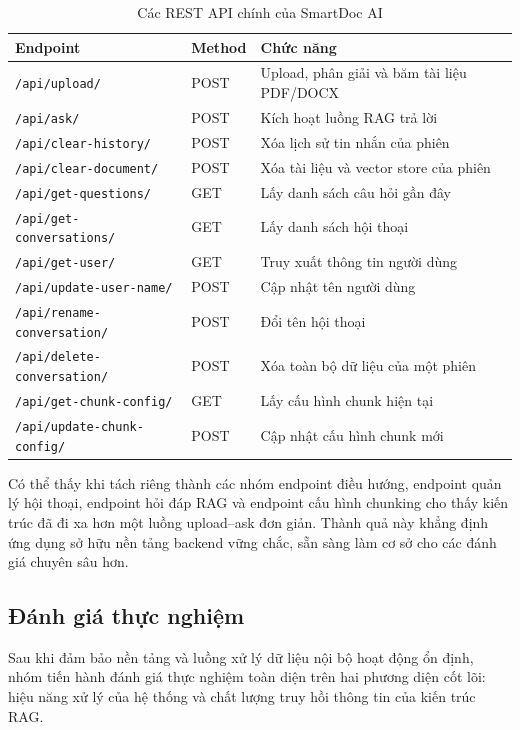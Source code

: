 \documentclass[10pt, conference, a4paper, compsocconf]{IEEEtran}
\newcommand{\smartdoc}{SmartDoc AI}
\begin{document}
\begin{table}[H]
  \renewcommand{\arraystretch}{1.1}
  \caption{Các REST API chính của \smartdoc{}}
  \label{tab:rest-api}
  \centering
  \scriptsize
  \begin{tabular}{|p{}|p{}|p{}|}
    \hline
    Endpoint & Method & Chức năng \\
    \hline
    \texttt{/api/upload/} & POST & Upload, phân giải và băm tài liệu PDF/DOCX \\
    \hline
    \texttt{/api/ask/} & POST & Kích hoạt luồng RAG trả lời \\
    \hline
    \texttt{/api/clear-history/} & POST & Xóa lịch sử tin nhắn của phiên \\
    \hline
    \texttt{/api/clear-document/} & POST & Xóa tài liệu và vector store của phiên \\
    \hline
    \texttt{/api/get-questions/} & GET & Lấy danh sách câu hỏi gần đây \\
    \hline
    \texttt{/api/get-conversations/} & GET & Lấy danh sách hội thoại \\
    \hline
    \texttt{/api/get-user/} & GET & Truy xuất thông tin người dùng \\
    \hline
    \texttt{/api/update-user-name/} & POST & Cập nhật tên người dùng \\
    \hline
    \texttt{/api/rename-conversation/} & POST & Đổi tên hội thoại \\
    \hline
    \texttt{/api/delete-conversation/} & POST & Xóa toàn bộ dữ liệu của một phiên \\
    \hline
    \texttt{/api/get-chunk-config/} & GET & Lấy cấu hình chunk hiện tại \\
    \hline
    \texttt{/api/update-chunk-config/} & POST & Cập nhật cấu hình chunk mới \\
    \hline
  \end{tabular}
\end{table}

Có thể thấy khi tách riêng thành các nhóm endpoint điều hướng, endpoint quản lý hội thoại, endpoint hỏi đáp RAG và endpoint cấu hình chunking cho thấy kiến trúc đã đi xa hơn một luồng upload--ask đơn giản. Thành quả này khẳng định ứng dụng sở hữu nền tảng backend vững chắc, sẵn sàng làm cơ sở cho các đánh giá chuyên sâu hơn.

\subsection{Đánh giá thực nghiệm}
Sau khi đảm bảo nền tảng và luồng xử lý dữ liệu nội bộ hoạt động ổn định, nhóm tiến hành đánh giá thực nghiệm toàn diện trên hai phương diện cốt lõi: hiệu năng xử lý của hệ thống và chất lượng truy hồi thông tin của kiến trúc RAG.
\end{document}
